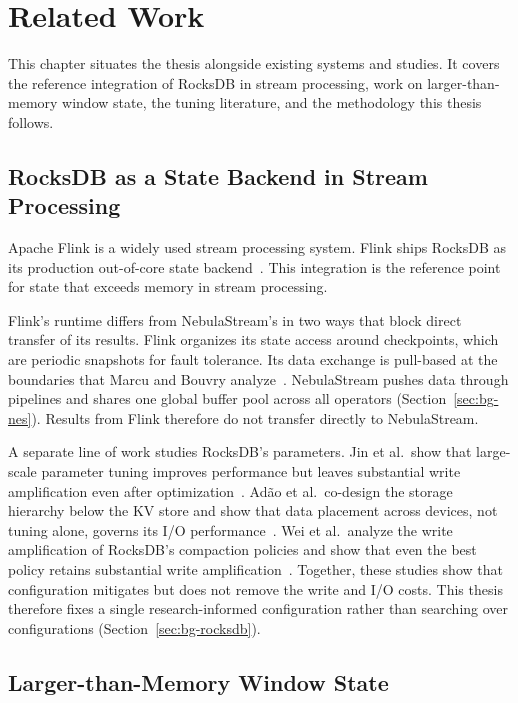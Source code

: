 \chapter{Related Work\label{cha:related}}

This chapter situates the thesis alongside existing systems and studies.
It covers the reference integration of RocksDB in stream processing, work on larger-than-memory window state, the tuning literature, and the methodology this thesis follows.

\section{RocksDB as a State Backend in Stream Processing\label{sec:rel-flink}}

Apache Flink is a widely used stream processing system.
Flink ships RocksDB as its production out-of-core state backend~\cite{flink2021}.
This integration is the reference point for state that exceeds memory in stream processing.

Flink's runtime differs from NebulaStream's in two ways that block direct transfer of its results.
Flink organizes its state access around checkpoints, which are periodic snapshots for fault tolerance.
Its data exchange is pull-based at the boundaries that Marcu and Bouvry analyze~\cite{marcu2022}.
NebulaStream pushes data through pipelines and shares one global buffer pool across all operators (Section~\ref{sec:bg-nes}).
Results from Flink therefore do not transfer directly to NebulaStream.

A separate line of work studies RocksDB's parameters.
Jin et al.\ show that large-scale parameter tuning improves performance but leaves substantial write amplification even after optimization~\cite{jin2022}.
Ad\~ao et al.\ co-design the storage hierarchy below the \ac{KV} store and show that data placement across devices, not tuning alone, governs its I/O performance~\cite{adao2025}.
Wei et al.\ analyze the write amplification of RocksDB's compaction policies and show that even the best policy retains substantial write amplification~\cite{wei2025}.
Together, these studies show that configuration mitigates but does not remove the write and I/O costs.
This thesis therefore fixes a single research-informed configuration rather than searching over configurations (Section~\ref{sec:bg-rocksdb}).

\section{Larger-than-Memory Window State\label{sec:rel-windows}}

